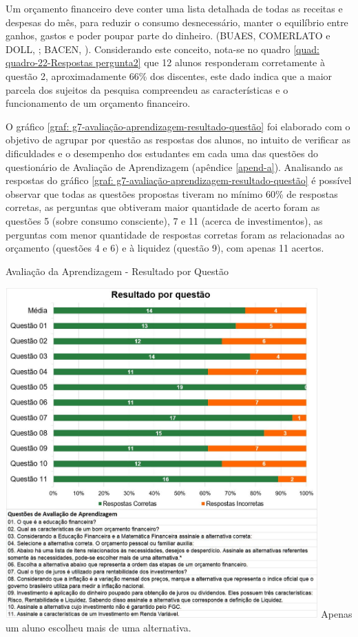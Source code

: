 Um orçamento financeiro deve conter uma lista detalhada de todas as receitas e despesas do mês, para reduzir o consumo desnecessário, manter o equilíbrio entre ganhos, gastos e poder poupar parte do dinheiro. (BUAES, COMERLATO e DOLL, \citeyear{buaes2015}; BACEN, \citeyear{bacen2013}). Considerando este conceito, nota-se no quadro \ref{quad: quadro-22-Respostas  pergunta2} que 12 alunos responderam corretamente à questão 2, aproximadamente 66\% dos discentes, este dado indica que a maior parcela dos sujeitos da pesquisa compreendeu as características e o funcionamento de um orçamento financeiro.

O gráfico \ref{graf: g7-avaliação-aprendizagem-resultado-questão} foi elaborado com o objetivo de agrupar por questão as respostas dos alunos, no intuito de verificar as dificuldades e o desempenho dos estudantes em cada uma das questões do questionário de Avaliação de Aprendizagem (apêndice \ref{apend-a}). Analisando as respostas do gráfico \ref{graf: g7-avaliação-aprendizagem-resultado-questão} é possível observar que todas as questões propostas tiveram no mínimo 60\% de respostas corretas, as perguntas que obtiveram maior quantidade de acerto foram as questões 5 (sobre consumo consciente), 7 e 11 (acerca de investimentos), as perguntas com menor quantidade de respostas corretas foram as relacionadas ao orçamento (questões 4 e 6) e à liquidez (questão 9), com apenas 11 acertos.

\graphicspath{{graficos/}} 
\begin{grafico}[!ht]
\centering
\begin{minipage}{0.8\textwidth}
\caption{Avaliação da Aprendizagem - Resultado por Questão}
\centering
\includegraphics[width=0.9\textwidth]{g7-avaliação-aprendizagem-resultado-questão}
\footnotemark\footnotesize * Apenas um aluno escolheu mais de uma alternativa.
\label{graf: g7-avaliação-aprendizagem-resultado-questão}
\end{minipage}
\end{grafico}

